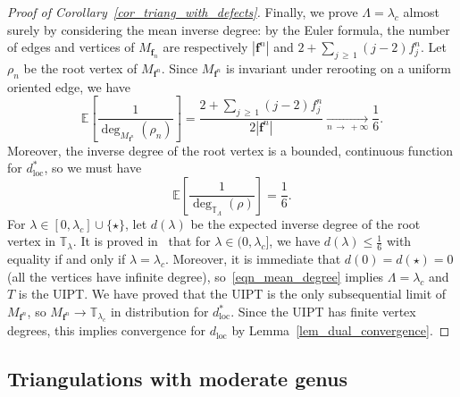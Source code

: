 \documentclass[10pt]{amsart}
\theoremstyle{definition}\newtheorem{defi}[theo]{Definition}\newtheorem{rema}[theo]{Remark}\newtheorem{exam}[theo]{Example}\newtheorem{exem}[theo]{Example}\newtheorem{nota}[theo]{Notation}
\newcommand{\loc}{\mathrm{loc}}
\newcommand{\TT}{\mathbb{T}}
\newcommand{\E}{\mathbb{E}}
\newcommand{\bff}{\mathbf{f}}
\begin{document}
\begin{proof}[Proof of Corollary~\ref{cor_triang_with_defects}]
Finally, we prove $\Lambda=\lambda_c$ almost surely by considering the mean inverse degree: by the Euler formula, the number of edges and vertices of $M_{\bff_n}$ are respectively $|\bff^n|$ and $2+\sum_{j\,\geq\,1} (j-2)f_j^n$. Let $\rho_n$ be the root vertex of $M_{\bff^n}$. Since $M_{\bff^n}$ is invariant under rerooting on a uniform oriented edge, we have
\[
\E \left[\frac{1}{\deg_{M_{\bff^n}}(\rho_n)} \right] = \frac{2+\sum_{j\,\geq\,1} (j-2)f_j^n}{2 \left|\bff^n\right|} \xrightarrow[n\,\to\,+\infty]{} \frac{1}{6}.
\]
Moreover, the inverse degree of the root vertex is a bounded, continuous function for $d_{\loc}^*$, so we must have
\begin{equation}\label{eqn_mean_degree}
\E \left[\frac{1}{\deg_{\TT_{\Lambda}}(\rho)} \right]=\frac{1}{6}.
\end{equation}
For $\lambda \in [0,\lambda_c] \cup \{\star\}$, let $d(\lambda)$ be the expected inverse degree of the root vertex in $\TT_{\lambda}$. It is proved in~\cite[Proposition~20]{BL19} that for $\lambda \in (0,\lambda_c]$, we have $d(\lambda) \leq \frac{1}{6}$ with equality if and only if $\lambda=\lambda_c$. Moreover, it is immediate that $d(0)=d(\star)=0$ (all the vertices have infinite degree), so~\eqref{eqn_mean_degree} implies $\Lambda=\lambda_c$ and $T$ is the UIPT. We have proved that the UIPT is the only subsequential limit of $M_{\bff^n}$, so $M_{\bff^n} \to \TT_{\lambda_c}$ in distribution for $d_{\loc}^*$. Since the UIPT has finite vertex degrees, this implies convergence for $d_{\loc}$ by Lemma~\ref{lem_dual_convergence}.
\end{proof}

\subsection{Triangulations with moderate genus}
\end{document}
